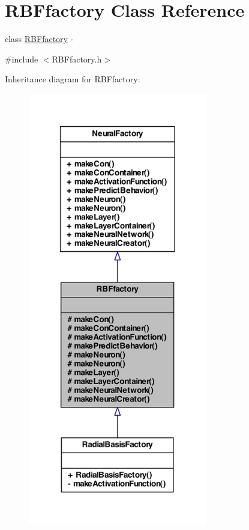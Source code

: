 \hypertarget{class_r_b_ffactory}{
\section{RBFfactory Class Reference}
\label{class_r_b_ffactory}
}


class \hyperlink{class_r_b_ffactory}{RBFfactory} -\/  




{\ttfamily \#include $<$RBFfactory.h$>$}



Inheritance diagram for RBFfactory:
\nopagebreak
\begin{figure}[H]
\begin{center}
\leavevmode
\includegraphics[width=222pt]{class_r_b_ffactory__inherit__graph}
\end{center}
\end{figure}


